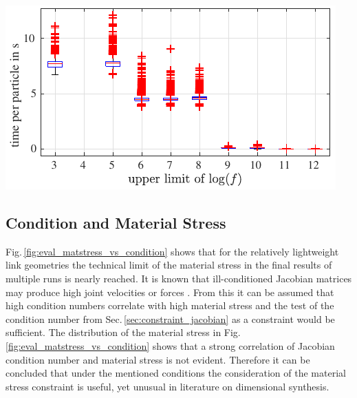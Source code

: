 \documentclass[fleqn,a4paper,10pt]{article}
\renewenvironment{figure}
  {\par\vspace{6pt}\noindent\minipage{\linewidth}}
  {\endminipage\par\vspace{6pt}}
\begin{document}
\begin{multicols}{2}
\begin{figure}
\centering
\includegraphics{./Bilder/figure_calctime_vs_fval.pdf}
\vspace{-0.4cm} %
\label{fig:boxplot_comptime}
\end{figure}

\subsection{Condition and Material Stress}
\label{sec:res_matstress}

Fig.\,\ref{fig:eval_matstress_vs_condition} shows that for the relatively lightweight link geometries the technical limit of the material stress in the final results of multiple runs is nearly reached.
It is known that ill-conditioned Jacobian matrices may produce high joint velocities or forces \cite{Merlet2006}.
From this it can be assumed that high condition numbers correlate with high material stress and the test of the condition number from Sec.\,\ref{sec:constraint_jacobian} as a constraint would be sufficient.
The distribution of the material stress in Fig.\,\ref{fig:eval_matstress_vs_condition} shows that a strong correlation of Jacobian condition number and material stress is not evident.
Therefore it can be concluded that under the mentioned conditions the consideration of the material stress constraint is useful, yet unusual in literature on dimensional synthesis.


\end{multicols}
\end{document}
